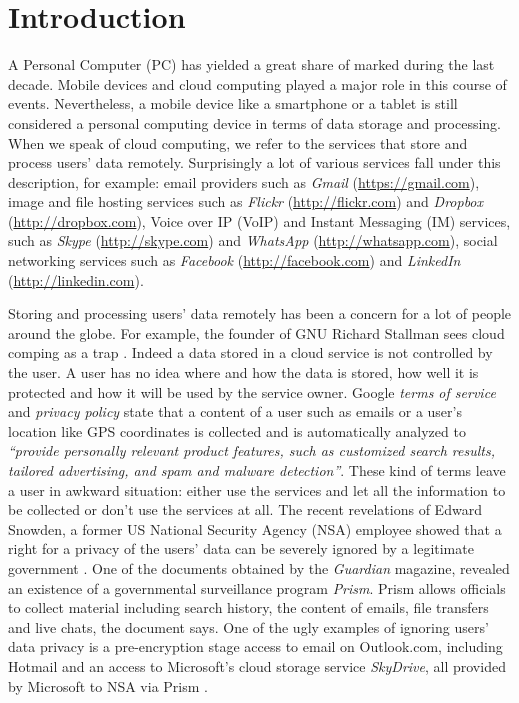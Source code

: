 \section{Introduction}

A Personal Computer (PC) has yielded a great share of marked during the
last decade. Mobile devices and cloud computing played a major role in
this course of events. Nevertheless, a mobile device like a smartphone or a
tablet is still considered a personal computing device in terms of data
storage and processing. When we speak of cloud computing, we refer to
the services that store and process users' data remotely.
Surprisingly a lot of various services fall under this description,
for example: email providers such as
\emph{Gmail} (\url{https://gmail.com}),
image and file hosting services such as
\emph{Flickr} (\url{http://flickr.com}) and
\emph{Dropbox} (\url{http://dropbox.com}),
Voice over IP (VoIP) and Instant Messaging (IM) services, such as
\emph{Skype} (\url{http://skype.com}) and
\emph{WhatsApp} (\url{http://whatsapp.com}),
social networking services such as
\emph{Facebook} (\url{http://facebook.com}) and
\emph{LinkedIn} (\url{http://linkedin.com}).

Storing and processing users' data remotely has been a concern for
a lot of people around the globe. For example, the founder of GNU
Richard Stallman sees cloud comping as a trap \citep{stallman-cloud-08}.
Indeed a data stored in a cloud service is not controlled by the user.
A user has no idea where and how the data is stored, how well it is
protected and how it will be used by the service owner.
Google \emph{terms of service} \citep{google-tos} and
\emph{privacy policy} \cite{google-privacy} state that a content of a user
such as emails or a user's location like GPS coordinates is collected
and is automatically analyzed to
\emph{``provide personally relevant product
features, such as customized search results, tailored advertising,
and spam and malware detection''}.
These kind of terms leave a user
in awkward situation: either use the services and let all the information
to be collected or don't use the services at all.
The recent revelations
of Edward Snowden, a former US National Security Agency (NSA) employee
showed that a right for a privacy of the users' data can be
severely ignored by a legitimate government \citep{snowden-timeline}.
One of the documents obtained by the \emph{Guardian} magazine,
revealed an existence of a governmental surveillance program
\emph{Prism}\cite{snowden-prism}. Prism allows officials to collect
material including search history, the content of emails, file
transfers and live chats, the document says. One of the ugly examples
of ignoring users' data privacy is a pre-encryption stage access
to email on Outlook.com, including Hotmail and an access to Microsoft's
cloud storage service \emph{SkyDrive}, all provided by Microsoft to NSA
via Prism \citep{snowden-ms-nsa}.

